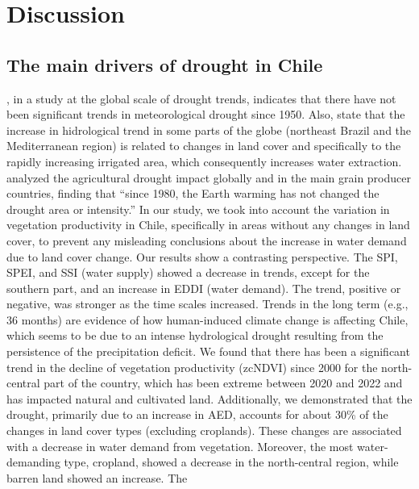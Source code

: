 \documentclass[
  authoryear,
  preprint,
  3p,
  onecolumn]{elsarticle}
\begin{document}
\hypertarget{discussion}{%
\section{Discussion}\label{discussion}}

\hypertarget{the-main-drivers-of-drought-in-chile}{%
\subsection{The main drivers of drought in
Chile}\label{the-main-drivers-of-drought-in-chile}}

\citet{Vicente-Serrano2022}, in a study at the global scale of drought
trends, indicates that there have not been significant trends in
meteorological drought since 1950. Also, state that the increase in
hidrological trend in some parts of the globe (northeast Brazil and the
Mediterranean region) is related to changes in land cover and
specifically to the rapidly increasing irrigated area, which
consequently increases water extraction. \citet{Kogan2020} analyzed the
agricultural drought impact globally and in the main grain producer
countries, finding that ``since 1980, the Earth warming has not changed
the drought area or intensity.'' In our study, we took into account the
variation in vegetation productivity in Chile, specifically in areas
without any changes in land cover, to prevent any misleading conclusions
about the increase in water demand due to land cover change. Our results
show a contrasting perspective. The SPI, SPEI, and SSI (water supply)
showed a decrease in trends, except for the southern part, and an
increase in EDDI (water demand). The trend, positive or negative, was
stronger as the time scales increased. Trends in the long term (e.g., 36
months) are evidence of how human-induced climate change is affecting
Chile, which seems to be due to an intense hydrological drought
resulting from the persistence of the precipitation deficit. We found
that there has been a significant trend in the decline of vegetation
productivity (zcNDVI) since 2000 for the north-central part of the
country, which has been extreme between 2020 and 2022 and has impacted
natural and cultivated land. Additionally, we demonstrated that the
drought, primarily due to an increase in AED, accounts for about 30\% of
the changes in land cover types (excluding croplands). These changes are
associated with a decrease in water demand from vegetation. Moreover,
the most water-demanding type, cropland, showed a decrease in the
north-central region, while barren land showed an increase. The
\end{document}
